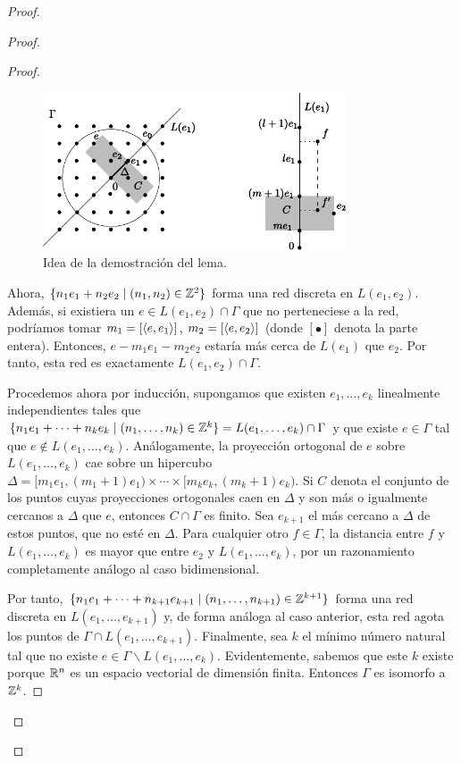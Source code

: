\begin{proof}
\begin{proof}
\begin{proof}
  \begin{figure}[h]
    \centering
    \includegraphics[width=0.8\textwidth]{pics/grupo.pdf}
    \caption{\small Idea de la demostración del lema.}
    \label{fig:grupo}
  \end{figure}

  Ahora, $\{n_1e_1+n_2e_2 \mid (n_1,n_2) \in \mathbb{Z}^2 \}$ forma una red discreta en $L(e_1,e_2)$. Además, si existiera un $e\in L(e_1,e_2)\cap \Gamma$ que no perteneciese a la red, podríamos tomar $m_1=[\left\langle e,e_1\right\rangle]$, $m_2=[\left\langle e,e_2\right\rangle]$ (donde $[\bullet]$ denota la parte entera). Entonces, $e-m_1e_1-m_2e_2$ estaría más cerca de $L(e_1)$ que $e_2$. Por tanto, esta red es exactamente $L(e_1,e_2) \cap \Gamma$.

      Procedemos ahora por inducción, supongamos que existen $e_1,\dots,e_k$ linealmente independientes tales que $\{n_1e_1+\cdots+n_ke_k \mid (n_1,\dots,n_k) \in \mathbb{Z}^k \} = L(e_1,\dots,e_k) \cap \Gamma$ y que existe $e\in \Gamma$ tal que $e \not\in L(e_1,\dots,e_k)$. Análogamente, la proyección ortogonal de $e$ sobre $L(e_1,\dots,e_k)$ cae sobre un hipercubo $\Delta=[m_1e_1,(m_1+1)e_1) \times \cdots \times [m_ke_k,(m_k+1)e_k)$. Si $C$ denota el conjunto de los puntos cuyas proyecciones ortogonales caen en $\Delta$ y son más o igualmente cercanos a $\Delta$ que $e$, entonces $C \cap \Gamma$ es finito. Sea $e_{k+1}$ el más cercano a $\Delta$ de estos puntos, que no esté en $\Delta$. Para cualquier otro $f \in \Gamma$, la distancia entre $f$ y $L(e_1,\dots,e_k)$ es mayor que entre $e_2$ y $L(e_1,\dots,e_k)$, por un razonamiento completamente análogo al caso bidimensional. 

	Por tanto, $\{n_1e_1+\dots+n_{k+1}e_{k+1} \mid (n_1,\dots,n_{k+1}) \in \mathbb{Z}^{k+1}\}$ forma una red discreta en $L(e_1,\dots,e_{k+1})$ y, de forma análoga al caso anterior, esta red agota los puntos de $\Gamma\cap L(e_1,\dots,e_{k+1})$.
	Finalmente, sea $k$ el mínimo número natural tal que no existe $e \in \Gamma \backslash L(e_1,\dots,e_k)$. Evidentemente, sabemos que este $k$ existe porque $\mathbb{R}^n$ es un espacio vectorial de dimensión finita. Entonces $\Gamma$ es isomorfo a $\mathbb{Z}^k$.
\end{proof}


\end{proof}
\end{proof}
